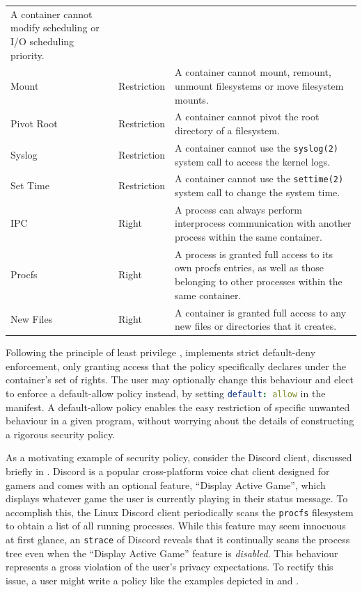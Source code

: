 \begin{table}[htpb]
\begin{tabular}{llp{25em}}
    A container cannot modify scheduling or I/O scheduling priority. \\
  Mount & Restriction &
    A container cannot mount, remount, unmount filesystems or move filesystem mounts. \\
  Pivot Root & Restriction &
    A container cannot pivot the root directory of a filesystem. \\
  Syslog & Restriction &
    A container cannot use the \texttt{syslog(2)} system call to access the kernel logs. \\
  Set Time & Restriction &
    A container cannot use the \texttt{settime(2)} system call to change the system time. \\
  \midrule
  IPC & Right &
    A process can always perform interprocess communication with another process within the same container. \\
  Procfs & Right &
    A process is granted full access to its own procfs entries, as well as those belonging to other processes within the same container. \\
  New Files & Right &
    A container is granted full access to any new files or directories that it creates. \\
  \bottomrule
  \end{tabular}
\end{table}

Following the principle of least privilege \cite{saltzer1975_protection},
\bpfcontain{} implements strict default-deny enforcement, only granting access
that the policy specifically declares under the container's set of rights. The
user may optionally change this behaviour and elect to enforce a default-allow
policy instead, by setting \lstinline[language=yaml]{default: allow} in the
manifest. A default-allow policy enables the easy restriction of specific
unwanted behaviour in a given program, without worrying about the details of
constructing a rigorous security policy.

 As a motivating example of \bpfcontain{} security policy, consider the Discord
client, discussed briefly in . Discord is a popular
cross-platform voice chat client designed for gamers and comes with an optional
feature, \enquote{Display Active Game}, which displays whatever game the user is
currently playing in their status message. To accomplish this, the Linux Discord
client periodically scans the \texttt{procfs} filesystem to obtain a list of all
running processes.  While this feature may seem innocuous at first glance, an
\texttt{strace} \cite{strace} of Discord reveals that it continually scans the
process tree even when the \enquote{Display Active Game} feature is
\textit{disabled}. This behaviour represents a gross violation of the user's
privacy expectations. To rectify this issue, a user might write a \bpfcontain{}
policy like the examples depicted in  and
.

